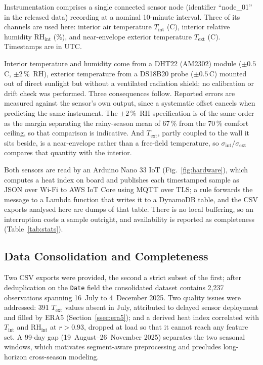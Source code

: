 \documentclass[conference]{IEEEtran}
\newcommand{\sigrat}{$\sigma_\text{int}/\sigma_\text{ext}$\xspace}
\begin{document}
Instrumentation comprises a single connected sensor node (identifier
``node\_01'' in the released data) recording at a nominal 10-minute
interval. Three of its channels are used here: interior air temperature
$T_\text{int}$ (\textdegree{}C), interior relative humidity
$\text{RH}_\text{int}$ (\%), and near-envelope exterior temperature
$T_\text{ext}$ (\textdegree{}C). Timestamps are in UTC.

Interior temperature and humidity come from a DHT22 (AM2302) module
($\pm0.5$\,\textdegree{}C, $\pm2\,\%$~RH), exterior temperature from a
DS18B20 probe ($\pm0.5$\,\textdegree{}C) mounted out of direct sunlight
but without a ventilated radiation shield; no calibration or drift
check was performed. Three consequences follow. Reported errors are
measured against the sensor's own output, since a systematic offset
cancels when predicting the same instrument. The $\pm2\,\%$~RH
specification is of the same order as the margin separating the
rainy-season mean of 67\,\% from the 70\,\% comfort ceiling, so that
comparison is indicative. And $T_\text{ext}$, partly coupled to the
wall it sits beside, is a near-envelope rather than a free-field
temperature, so \sigrat compares that quantity with the interior.

Both sensors are read by an Arduino Nano 33 IoT (Fig.~\ref{fig:hardware}), which computes a heat
index on board and publishes each timestamped sample as JSON over Wi-Fi
to AWS IoT Core using MQTT over TLS; a rule forwards the message to a
Lambda function that writes it to a DynamoDB table, and the CSV exports
analysed here are dumps of that table. There is no local buffering, so
an interruption costs a sample outright, and availability is reported
as completeness (Table~\ref{tab:stats}).

\subsection{Data Consolidation and Completeness}
\label{ssec:completeness}

Two CSV exports were provided, the second a strict subset of the first;
after deduplication on the \texttt{Date} field the consolidated dataset
contains 2,237 observations spanning 16~July to 4~December 2025. Two
quality issues were addressed: 391 $T_\text{ext}$ values absent in
July, attributed to delayed sensor deployment and filled by ERA5
(Section~\ref{ssec:era5}); and a derived heat index correlated with
$T_\text{int}$ and $\text{RH}_\text{int}$ at $r>0.93$, dropped at load
so that it cannot reach any feature set. A 99-day gap
(19~August--26~November 2025) separates the two seasonal windows, which
motivates segment-aware preprocessing and precludes long-horizon
cross-season modeling.
\end{document}
